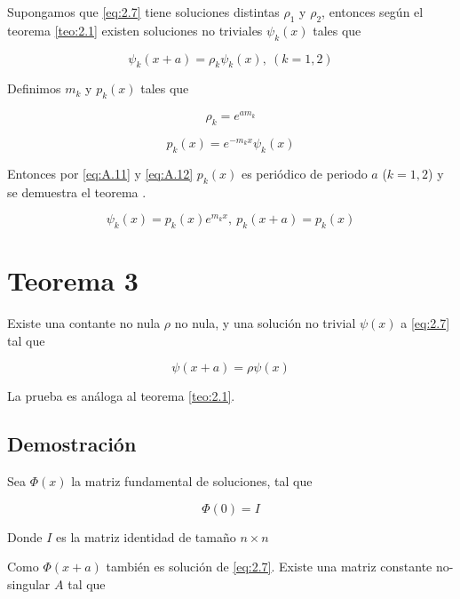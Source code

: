 Supongamos que \ref{eq:2.7} tiene soluciones distintas $\rho_1$ y $\rho_2$, entonces según el teorema \ref{teo:2.1} existen soluciones no triviales $\psi_k(x)$ tales que 

\begin{equation}\label{eq:A.11}
    \psi_k(x+a)=\rho_k\psi_k(x), \ (k=1,2)
\end{equation}

Definimos $m_k$ y $p_k(x)$ tales que

\begin{equation}\label{eq:A.12}
   \rho_k=e^{am_k}
\end{equation}

\begin{equation}\label{eq:A.13}
    p_k(x)=e^{-m_kx}\psi_k(x)
\end{equation}

Entonces por \ref{eq:A.11} y \ref{eq:A.12} $p_k(x)$ es periódico de periodo $a$ ($k=1,2$) y se demuestra el teorema \cite{floquet}.

\begin{equation}\label{eq:A.14}
  \psi_k(x)=p_k(x)e^{m_kx},\  p_k(x+a)=p_k(x)
\end{equation}

\section{Teorema 3}

Existe una contante no nula $\rho$ no nula, y una solución no trivial $\psi(x)$ a \ref{eq:2.7} tal que 

\begin{equation}\label{eq:A.15}
    \psi(x+a)=\rho \psi(x)
\end{equation}

La prueba es análoga al teorema \ref{teo:2.1}. 

\subsection*{Demostración}
Sea $\Phi(x)$ la matriz fundamental de soluciones, tal que 

\begin{equation}\label{eq:A.16}
    \Phi(0)=I
\end{equation}

Donde $I$ es la matriz identidad de tamaño $n \times n$ 

Como $\Phi(x+a)$ también es solución de \ref{eq:2.7}. Existe una matriz constante no-singular $A$ tal que 

